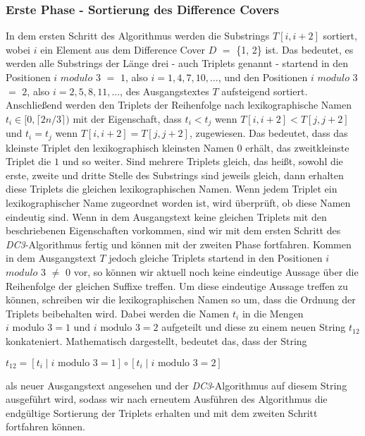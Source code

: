 \subsubsection{Erste Phase - Sortierung des Difference Covers}
\label{dc3:algorithmus:phase1}

In dem ersten Schritt des Algorithmus werden die Substrings $T[i, i+2]$ sortiert, wobei $i$ ein Element aus dem Difference Cover \(D\) $=$ \{1, 2\} ist. Das bedeutet, es werden alle Substrings der Länge drei - auch Triplets genannt - startend in den Positionen \(i\) \(modulo\) \(3\) $=$ \(1\), also $i = 1, 4, 7, 10,...$, und den Positionen \(i\) \(modulo\) \(3\) $=$ \(2\), also $i = 2, 5, 8, 11,...$, des Ausgangstextes $T$ aufsteigend sortiert.
Anschließend werden den Triplets der Reihenfolge nach lexikographische Namen $t_i \in [0,\lceil2n/3\rceil)$ mit der Eigenschaft, dass $t_i < t_j$ wenn $T[i, i+2] < T[j, j+2]$ und $t_i = t_j$ wenn $T[i, i+2] = T[j, j+2]$, zugewiesen. Das bedeutet, dass das kleinste Triplet den lexikographisch kleinsten Namen $0$ erhält, das zweitkleinste Triplet die $1$ und so weiter. Sind mehrere Triplets gleich, das heißt, sowohl die erste, zweite und dritte Stelle des Substrings sind jeweils gleich, dann erhalten diese Triplets die gleichen lexikographischen Namen.
Wenn jedem Triplet ein lexikographischer Name zugeordnet worden ist, wird überprüft, ob diese Namen eindeutig sind. Wenn in dem Ausgangstext keine gleichen Triplets mit den beschriebenen Eigenschaften vorkommen, sind wir mit dem ersten Schritt des \emph{DC3}-Algorithmus fertig und können mit der zweiten Phase fortfahren. Kommen in dem Ausgangstext $T$ jedoch gleiche Triplets startend in den Positionen \(i\) \(modulo\) \(3\) $\neq$ \(0\) vor, so können wir aktuell noch keine eindeutige Aussage über die Reihenfolge der gleichen Suffixe treffen. Um diese eindeutige Aussage treffen zu können, schreiben wir die lexikographischen Namen so um, dass die Ordnung der Triplets beibehalten wird. Dabei werden die Namen $t_i$ in die Mengen $i \text{ modulo } 3 = 1$ und $i \text{ modulo } 3 = 2$ aufgeteilt und diese zu einem neuen String $t_{12}$ konkateniert. Mathematisch dargestellt, bedeutet das, dass der String
\begin{center}
	$t_{12} = [t_i \mid i \text{ modulo } 3 = 1] \circ [t_i \mid i \text{ modulo } 3 = 2]$ 
\end{center}
als neuer Ausgangstext angesehen und der \emph{DC3}-Algorithmus auf diesem String ausgeführt wird, sodass wir nach erneutem Ausführen des Algorithmus die endgültige Sortierung der Triplets erhalten und mit dem zweiten Schritt fortfahren können.

